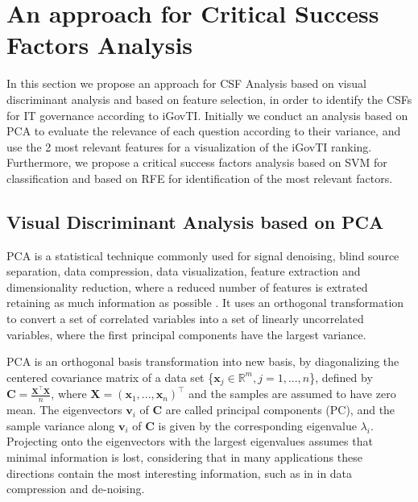 \section{An approach for Critical Success Factors Analysis}
\label{sec:b_csf_fs}

In this section we propose an approach for CSF Analysis based on visual discriminant analysis and based on feature selection, in order to identify the CSFs for IT governance according to iGovTI. Initially we conduct an analysis based on PCA to evaluate the relevance of each question according to their variance, and use the 2 most relevant features for a visualization of the iGovTI ranking. Furthermore, we propose a critical success factors analysis based on SVM for classification and based on RFE for identification of the most relevant factors.

\subsection{Visual Discriminant Analysis based on PCA}
\label{sec:b_pca}

PCA is a statistical technique commonly used for signal denoising, blind source separation, data compression, data visualization, feature extraction and dimensionality reduction, where a reduced number of features is extrated retaining as much information as possible \cite{jolliffe1986principal}. It uses an orthogonal transformation to convert a set of correlated variables into a set of linearly uncorrelated variables, where the first principal components have the largest variance.

PCA is an orthogonal basis transformation into new basis, by diagonalizing the centered covariance matrix of a data set \{$\mathbf{x}_j \in \mathbb{R}^m, j = 1, ... ,n$\}, defined by $\mathbf{C} = \frac{\mathbf{X}^\intercal\mathbf{X}}{n}$, where $\mathbf{X} = (\mathbf{x}_1, ... , \mathbf{x}_n)^\intercal$ and the samples are assumed to have zero mean. The eigenvectors $\mathbf{v}_i$ of $\mathbf{C}$ are called principal components (PC), and the sample variance along $\mathbf{v}_i$ of $\mathbf{C}$ is given by the corresponding eigenvalue $\lambda_i$. Projecting onto the eigenvectors with the largest eigenvalues assumes that minimal information is lost, considering that in many applications these directions contain the most interesting information, such as in in data compression and de-noising.

